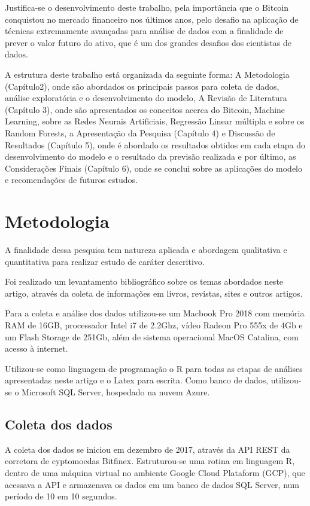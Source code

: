 \documentclass[12pt]{article}
\begin{document}
Justifica-se o desenvolvimento deste trabalho, pela importância que o Bitcoin
conquistou no mercado financeiro nos últimos anos, pelo desafio na aplicação de
técnicas extremamente avançadas para análise de dados com a finalidade de prever 
o valor futuro do ativo, que é um dos grandes desafios dos cientistas de dados.

A estrutura deste trabalho está organizada da seguinte forma: 
A Metodologia (Capítulo2), onde são abordados os principais passos para 
coleta de dados, análise exploratória e o desenvolvimento do modelo, A Revisão 
de Literatura (Capítulo 3), onde são apresentados os conceitos acerca do 
Bitcoin, Machine Learning,  sobre as Redes Neurais Artificiais, Regressão Linear 
múltipla e sobre os Random Forests, a Apresentação 
da Pesquisa (Capítulo 4) e Discussão de Resultados (Capítulo 5), onde é abordado 
os resultados obtidos em cada etapa do desenvolvimento do modelo e o 
resultado da previsão realizada e por último, as Considerações Finais 
(Capítulo 6), onde se conclui sobre as aplicações do modelo e recomendações de 
futuros estudos.


\section{Metodologia} \label{sec:firstpage}

A finalidade dessa pesquisa tem natureza aplicada e abordagem qualitativa e 
quantitativa para realizar estudo de caráter descritivo.

Foi realizado um levantamento bibliográfico sobre os temas abordados neste 
artigo, através da coleta de informações em livros, revistas, sites e outros 
artigos.

Para a coleta e análise dos dados utilizou-se um Macbook Pro 2018 com memória 
RAM de 16GB, processador Intel i7 de 2.2Ghz, vídeo Radeon Pro 555x de 4Gb e um
Flash Storage de 251Gb, além de sistema operacional MacOS Catalina, com acesso
à internet.

Utilizou-se como linguagem de programação o R \cite{r:2020} para todas as etapas 
de análises apresentadas neste artigo e o Latex \cite{goossens93} para escrita. 
Como banco de dados, utilizou-se o Microsoft SQL Server, hospedado na nuvem 
Azure.

\subsection{Coleta dos dados}

A coleta dos dados se iniciou em dezembro de 2017, através da API REST da 
corretora de cyptomoedas Bitfinex. Estruturou-se uma rotina em linguagem R, 
dentro de uma máquina virtual no ambiente Google Cloud Plataform (GCP), 
que acessava a API e armazenava os dados em um banco de dados SQL Server, 
num período de 10 em 10 segundos.
\end{document}

